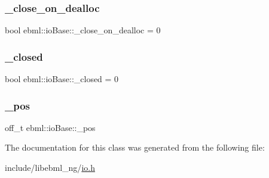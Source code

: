 \subsubsection{\texorpdfstring{\+\_\+close\+\_\+on\+\_\+dealloc}{\_close\_on\_dealloc}}
{\footnotesize\ttfamily bool ebml\+::io\+Base\+::\+\_\+close\+\_\+on\+\_\+dealloc = 0\hspace{0.3cm}{\ttfamily [protected]}}

\mbox{\label{classebml_1_1ioBase_ab87e105b03270d59019c05e7451b51d3}} 
\subsubsection{\texorpdfstring{\+\_\+closed}{\_closed}}
{\footnotesize\ttfamily bool ebml\+::io\+Base\+::\+\_\+closed = 0\hspace{0.3cm}{\ttfamily [protected]}}

\mbox{\label{classebml_1_1ioBase_ada889242b80f658e0a80a465bf2bd9f7}} 
\subsubsection{\texorpdfstring{\+\_\+pos}{\_pos}}
{\footnotesize\ttfamily off\+\_\+t ebml\+::io\+Base\+::\+\_\+pos\hspace{0.3cm}{\ttfamily [protected]}}



The documentation for this class was generated from the following file\+:\begin{DoxyCompactItemize}
\item 
include/libebml\+\_\+ng/\mbox{\hyperlink{io_8h}{io.\+h}}\end{DoxyCompactItemize}
